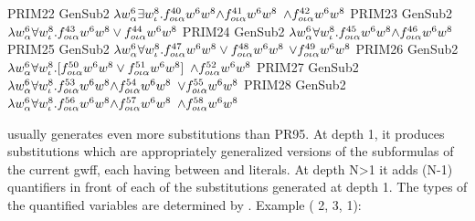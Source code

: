\begin{tpsexample}
     PRIM22   GenSub2   \(\lambda w \sp{{6}}\sb{\alpha}   \exists w \sp{{8}}\sb{\iota} .f \sp{{40}}\sb{o\iota\alpha}  w \sp{{6}}  w \sp{{8}}  \mathord{\wedge} f \sp{{41}}\sb{o\iota\alpha}  w \sp{{6}}  w \sp{{8}}  \)
               \(\land f \sp{{42}}\sb{o\iota\alpha}  w \sp{{6}}  w \sp{{8}}\)
     PRIM23   GenSub2   \(\lambda w \sp{{6}}\sb{\alpha}   \forall w \sp{{8}}\sb{\iota} .f \sp{{43}}\sb{o\iota\alpha}  w \sp{{6}}  w \sp{{8}}  \lor f \sp{{44}}\sb{o\iota\alpha}  w \sp{{6}}  w \sp{{8}}\)
     PRIM24   GenSub2   \(\lambda w \sp{{6}}\sb{\alpha}   \forall w \sp{{8}}\sb{\iota} .f \sp{{45}}\sb{o\iota\alpha}  w \sp{{6}}  w \sp{{8}}  \mathord{\wedge} f \sp{{46}}\sb{o\iota\alpha}  w \sp{{6}}  w \sp{{8}}\)
     PRIM25   GenSub2   \(\lambda w \sp{{6}}\sb{\alpha}   \forall w \sp{{8}}\sb{\iota} .f \sp{{47}}\sb{o\iota\alpha}  w \sp{{6}}  w \sp{{8}}  \lor f \sp{{48}}\sb{o\iota\alpha}  w \sp{{6}}  w \sp{{8}}  \)
               \(\lor f \sp{{49}}\sb{o\iota\alpha}  w \sp{{6}}  w \sp{{8}}\)
     PRIM26   GenSub2   \(\lambda w \sp{{6}}\sb{\alpha}   \forall w \sp{{8}}\sb{\iota} .[f \sp{{50}}\sb{o\iota\alpha}  w \sp{{6}}  w \sp{{8}}  \lor f \sp{{51}}\sb{o\iota\alpha}  w \sp{{6}}  w \sp{{8}} ] \)
               \(\land f \sp{{52}}\sb{o\iota\alpha}  w \sp{{6}}  w \sp{{8}}\)
     PRIM27   GenSub2   \(\lambda w \sp{{6}}\sb{\alpha}   \forall w \sp{{8}}\sb{\iota} .f \sp{{53}}\sb{o\iota\alpha}  w \sp{{6}}  w \sp{{8}}  \mathord{\wedge} f \sp{{54}}\sb{o\iota\alpha}  w \sp{{6}}  w \sp{{8}}  \)
               \(\lor f \sp{{55}}\sb{o\iota\alpha}  w \sp{{6}}  w \sp{{8}}\)
     PRIM28   GenSub2   \(\lambda w \sp{{6}}\sb{\alpha}   \forall w \sp{{8}}\sb{\iota} .f \sp{{56}}\sb{o\iota\alpha}  w \sp{{6}}  w \sp{{8}}  \mathord{\wedge} f \sp{{57}}\sb{o\iota\alpha}  w \sp{{6}}  w \sp{{8}}  \)
               \(\land f \sp{{58}}\sb{o\iota\alpha}  w \sp{{6}}  w \sp{{8}}\)
\end{tpsexample}

 usually generates even more substitutions than PR95.
At depth 1, it produces substitutions which are appropriately generalized versions of
the subformulas of the current gwff, each having between 
and  literals.
At depth N>1 it adds (N-1) quantifiers in front of each of the substitutions generated at
depth 1. The types of the quantified variables are determined by .
Example ( 2,  3,  1):


